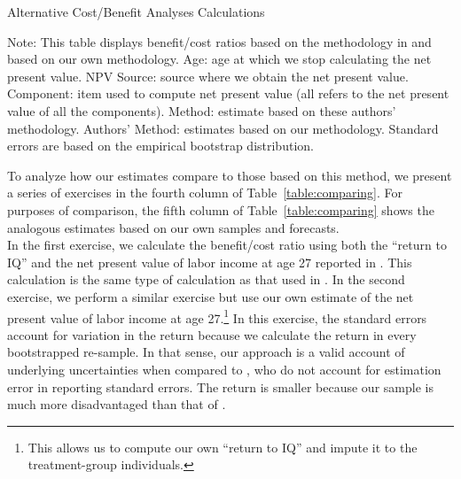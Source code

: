 \begin{table}[!htbp]
\begin{threeparttable}
\caption{Alternative Cost/Benefit Analyses Calculations}
\label{table:comparing}
\centering
\footnotesize

\begin{tablenotes}
\footnotesize
\item Note: This table displays benefit/cost ratios based on the methodology in \citet{Kline_Walters_2016_QJE} and based on our own methodology. Age: age at which we stop calculating the net present value. NPV Source: source where we obtain the net present value. Component: item used to compute net present value (all refers to the net present value of all the components). \citet{Kline_Walters_2016_QJE} Method: estimate based on these authors' methodology. Authors' Method: estimates based on our methodology. Standard errors are based on the empirical bootstrap distribution.
\end{tablenotes}
\end{threeparttable}
\end{table}

\noindent To analyze how our estimates compare to those based on this method, we present a series of exercises in the fourth column of Table~\ref{table:comparing}. For purposes of comparison, the fifth column of Table~\ref{table:comparing} shows the analogous estimates based on our own samples and forecasts.\\

\noindent In the first exercise, we calculate the benefit/cost ratio using both the ``return to IQ'' and the net present value of labor income at age 27 reported in \citet{Chetty_Friedman_etal_2011_QJoE}. This calculation is the same type of calculation as that used in \citet{Kline_Walters_2016_QJE}. In the second exercise, we perform a similar exercise but use our own estimate of the net present value of labor income at age 27.\footnote{This allows us to compute our own ``return to IQ'' and impute it to the treatment-group individuals.} In this exercise, the standard errors account for variation in the return because we calculate the return in every bootstrapped re-sample. In that sense, our approach is a valid account of underlying uncertainties when compared to \citet{Kline_Walters_2016_QJE}, who do not account for estimation error in reporting standard errors. The return is smaller because our sample is much more disadvantaged than that of \citet{Chetty_Friedman_etal_2011_QJoE}.\\

